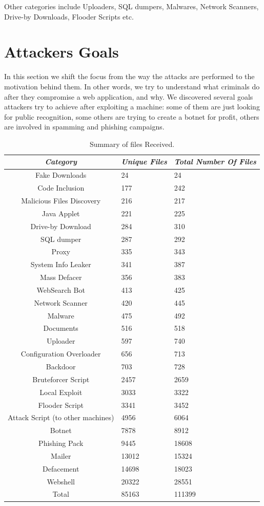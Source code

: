 Other categories include Uploaders, SQL dumpers, Malwares, Network Scanners, Drive-by Downloads, Flooder Scripts etc.

\section{Attackers Goals}

In this section we shift the focus from the way the attacks are performed to the motivation behind them. In other words, we try to understand what criminals do after they compromise a web application, and why. We discovered several goals attackers try to achieve after exploiting a machine: some of them are just looking for public recognition, some others are trying to create a botnet for profit, others are involved in spamming and phishing campaigns.

\begin{table}[tbh] %
\begin{center}
\begin{tabularx}{\textwidth}{|c|X|X|}
\hline
\textit{Category} & \textit{Unique Files} & \textit{Total Number Of Files} \\
\hline
Fake Downloads & 24 & 24 \\
Code Inclusion & 177 & 242 \\
Malicious Files Discovery & 216 & 217 \\
Java Applet & 221 & 225 \\
Drive-by Download & 284 & 310 \\
SQL dumper & 287 & 292 \\
Proxy & 335 & 343 \\
System Info Leaker & 341 & 387 \\
Mass Defacer & 356 & 383 \\
WebSearch Bot & 413 & 425 \\
Network Scanner & 420 & 445 \\
Malware & 475 & 492 \\
Documents & 516 & 518 \\
Uploader & 597 & 740 \\
Configuration Overloader & 656 & 713 \\
Backdoor & 703 & 728 \\
Bruteforcer Script & 2457 & 2659 \\
Local Exploit & 3033 & 3322 \\
Flooder Script & 3341 & 3452 \\
Attack Script (to other machines) & 4956 & 6064 \\
Botnet & 7878 & 8912 \\
Phishing Pack & 9445 & 18608 \\
Mailer & 13012 & 15324 \\
Defacement & 14698 & 18023 \\
Webshell & 20322 & 28551 \\
\hline \hline
Total & 85163 & 111399 \\
\hline
\end{tabularx}
\caption{Summary of files Received.\label{tab:webapps}}
\end{center}
\end{table}

